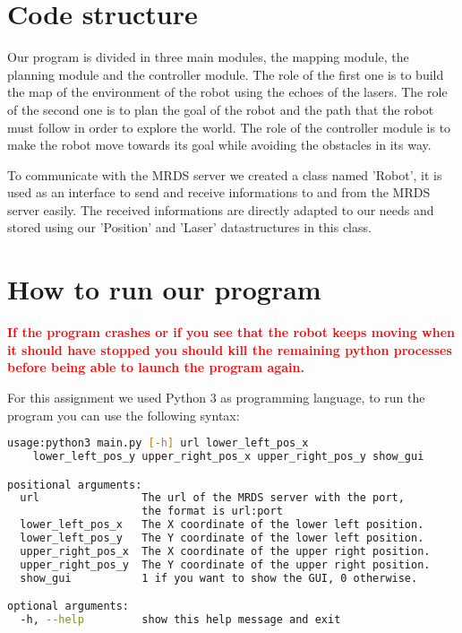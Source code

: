 \section{Code structure}

Our program is divided in three main modules, the mapping module, the planning module and the controller module.
The role of the first one is to build the map of the environment of the robot using the echoes of the lasers.
The role of the second one is to plan the goal of the robot and the path that the robot must follow in order to explore the world.
The role of the controller module is to make the robot move towards its goal while avoiding the obstacles in its way.

To communicate with the MRDS server we created a class named 'Robot', it is used as an interface to send and receive informations to and from the MRDS server easily.
The received informations are directly adapted to our needs and stored using our 'Position' and 'Laser' datastructures in this class.

\section{How to run our program}

\textcolor{red}{\textbf{If the program crashes or if you see that the robot keeps moving when it should have stopped you should kill the remaining python processes before being able to launch the program again.}}

For this assignment we used Python 3 as programming language, to run the program you can use the following syntax:

\begin{lstlisting}[language=bash, basicstyle=\small]
usage:python3 main.py [-h] url lower_left_pos_x 
    lower_left_pos_y upper_right_pos_x upper_right_pos_y show_gui

positional arguments:
  url                The url of the MRDS server with the port, 
                     the format is url:port
  lower_left_pos_x   The X coordinate of the lower left position.
  lower_left_pos_y   The Y coordinate of the lower left position.
  upper_right_pos_x  The X coordinate of the upper right position.
  upper_right_pos_y  The Y coordinate of the upper right position.
  show_gui           1 if you want to show the GUI, 0 otherwise.

optional arguments:
  -h, --help         show this help message and exit
\end{lstlisting}
